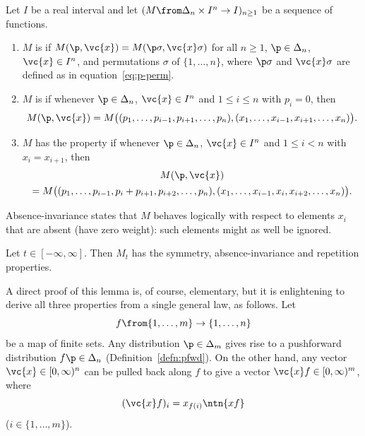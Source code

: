 \begin{defn}
Let $I$ be a real interval and let $(M \from \Delta_n \times I^n \to I)_{n
  \geq 1}$ be a sequence of functions.
% 
\begin{enumerate}
\item 
{}
$M$ is %
% 
% 
if $M(\p, \vc{x}) = M(\p\sigma, \vc{x}\sigma)$ for
  all $n \geq 1$, $\p \in \Delta_n$, $\vc{x} \in I^n$, and permutations
  $\sigma$ of $\{1, \ldots, n\}$, where $\p\sigma$ and $\vc{x}\sigma$ are
  defined as in equation~\eqref{eq:p-perm}.

\item
{}
$M$ is %
%
%
if whenever $\p \in \Delta_n$, $\vc{x} \in I^n$ and $1 \leq i \leq n$ with
$p_i = 0$, then
\[
M(\p, \vc{x})
=
M\bigl(
(p_1, \ldots, p_{i - 1}, p_{i + 1}, \ldots, p_n),
(x_1, \ldots, x_{i - 1}, x_{i + 1}, \ldots, x_n)
\bigr).
\]

\item
$M$ has the %
% 
% 
property if
whenever $\p \in \Delta_n$, $\vc{x} \in I^n$ and $1 \leq i < n$ with $x_i
= x_{i + 1}$, then
% 
\begin{multline*}
M(\p, \vc{x}) 
\\
=
M\bigl(
(p_1, \ldots, p_{i - 1}, p_i + p_{i + 1}, p_{i + 2}, \ldots, p_n),
(x_1, \ldots, x_{i - 1}, x_i, x_{i + 2}, \ldots, x_n)
\bigr).
\end{multline*}
\end{enumerate}
\end{defn}

Absence-invariance states that $M$ behaves logically with respect to
elements $x_i$ that are absent (have zero weight): such elements might as
well be ignored.

\begin{lemma}
% 
Let $t \in [-\infty, \infty]$.  Then $M_t$ has the symmetry,
absence-invariance and repetition properties.
\end{lemma}

A direct proof of this lemma is, of course, elementary, but it is
enlightening to derive all three properties from a single general law, as
follows.  Let
\[
f \from \{1, \ldots, m\} \to \{1, \ldots, n\}
\]
be a map of finite sets.  Any distribution $\p \in \Delta_m$ gives rise to
a pushforward distribution $f \p \in \Delta_n$
(Definition~\ref{defn:pfwd}).  On the other hand, any vector $\vc{x} \in
[0, \infty)^n$ can be pulled back along $f$ to give a vector $\vc{x}f \in
  [0, \infty)^m$, where
\[
(\vc{x}f)_i = x_{f(i)}
\ntn{xf}
\]
($i \in \{1, \ldots, m\}$).  

